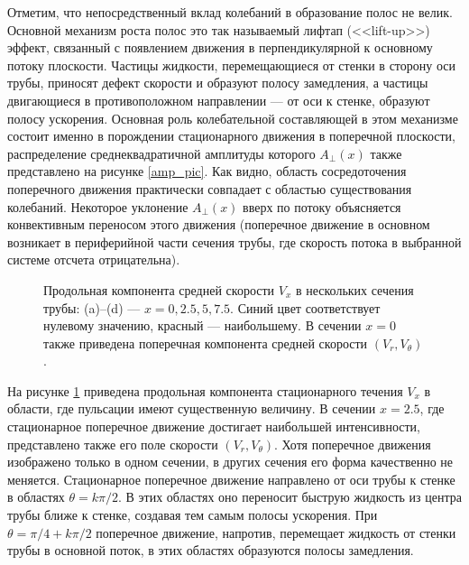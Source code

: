 Отметим, что непосредственный вклад колебаний в образование полос не велик. Основной механизм роста полос это так называемый лифтап (<<lift-up>>) эффект, связанный с появлением движения в перпендикулярной к основному потоку плоскости. Частицы жидкости, перемещающиеся от стенки в сторону оси трубы, приносят дефект скорости и образуют полосу замедления, а частицы двигающиеся в противоположном направлении --- от оси к стенке, образуют полосу ускорения. Основная роль колебательной составляющей в этом механизме состоит именно в порождении стационарного движения в поперечной плоскости, распределение среднеквадратичной амплитуды которого $A_{\perp}(x)$ также представлено на рисунке \ref{amp_pic}. Как видно, область сосредоточения поперечного движения практически совпадает с областью существования колебаний. Некоторое уклонение $A_{\perp}(x)$ вверх по потоку объясняется конвективным переносом этого движения (поперечное движение в основном возникает в периферийной части сечения трубы, где скорость потока в выбранной системе отсчета отрицательна).

\begin{figure}[h]
\caption{Продольная компонента средней скорости $V_x$ в нескольких сечения трубы: (a)--(d) --- $x = 0, 2.5, 5, 7.5$. Синий цвет соответствует нулевому значению, красный --- наибольшему. В сечении $x = 0$ также приведена поперечная компонента средней скорости $(V_r, V_\theta)$.}
\label{VEL_cs_pic}
\end{figure}

На рисунке \ref{VEL_cs_pic} приведена продольная компонента стационарного течения $V_x$ в области, где пульсации имеют существенную величину. В сечении $x = 2.5$, где стационарное поперечное движение достигает наибольшей интенсивности, представлено также его поле скорости $(V_r, V_\theta)$. Хотя поперечное движения изображено только в одном сечении, в других сечения его форма качественно не меняется. Стационарное поперечное движение направлено от оси трубы к стенке в областях $\theta=k\pi/2$. В этих областях оно переносит быструю жидкость из центра трубы ближе к стенке, создавая тем самым полосы ускорения. При $\theta=\pi/4+k\pi/2$ поперечное движение, напротив, перемещает жидкость от стенки трубы в основной поток, в этих областях образуются полосы замедления. 


